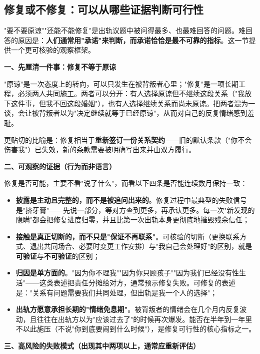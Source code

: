 \subsection{修复或不修复：可以从哪些证据判断可行性}

"要不要原谅""还能不能修复"是出轨议题中被问得最多、也最难回答的问题。难回答的原因是：\textbf{人们通常用"承诺"来判断，而承诺恰恰是最不可靠的指标}。这一节提供一个更可核验的观察框架。

\textbf{一、先厘清一件事：修复不等于原谅}

"原谅"是一次态度上的转向，可以只发生在被背叛者心里；"修复"是一项长期工程，必须两人共同施工。两者可以分开：有人选择原谅但不继续这段关系（"我放下这件事，但我不回这段婚姻"），也有人选择继续关系而尚未原谅。把两者混为一谈，会让被背叛者以为"决定继续就等于已经原谅"，从而对自己的反复情绪感到羞耻。

更贴切的比喻是：修复相当于\textbf{重新签订一份关系契约}——旧的默认条款（"你不会伤害我"）已失效，新的条款需要被明确写出来并由双方履行。

\textbf{二、可观察的证据（行为而非语言）}

修复是否可能，主要不看"说了什么"，而看以下四条是否能连续数月保持一致：

\begin{itemize}
\item \textbf{披露是主动且完整的，而不是被追问出来的}。修复过程中最典型的失败信号是"挤牙膏"——先说一部分，等对方查到更多，再承认更多。每一次"新发现的隐瞒"都会把修复进度归零，并且比第一次出轨本身更彻底地摧毁残余信任；
\item \textbf{接触是真正切断的，而不只是"保证不再联系"}。可核验的切断（更换联系方式、退出共同场合、必要时变更工作安排）与"我自己会处理好"的区别，就是\textbf{可验证}与\textbf{不可验证}的区别；
\item \textbf{归因是单方面的}。"因为你不理我""因为你只顾孩子""因为我们已经没有性生活"——这类表述把责任分摊给对方，通常预示修复失败。可修复的表述是："关系有问题需要我们共同处理，但出轨是我一个人的选择"；
\item \textbf{出轨方愿意承担长期的"情绪免息期"}。被背叛者的情绪会在几个月内反复波动，且往往在出轨方以为"应该过去了"的时候再次爆发。能否在半年到一年里不以此施压（不说"你到底要闹到什么时候"），是修复可行性的核心指标之一。
\end{itemize}

\textbf{三、高风险的失败模式（出现其中两项以上，通常应重新评估）}

